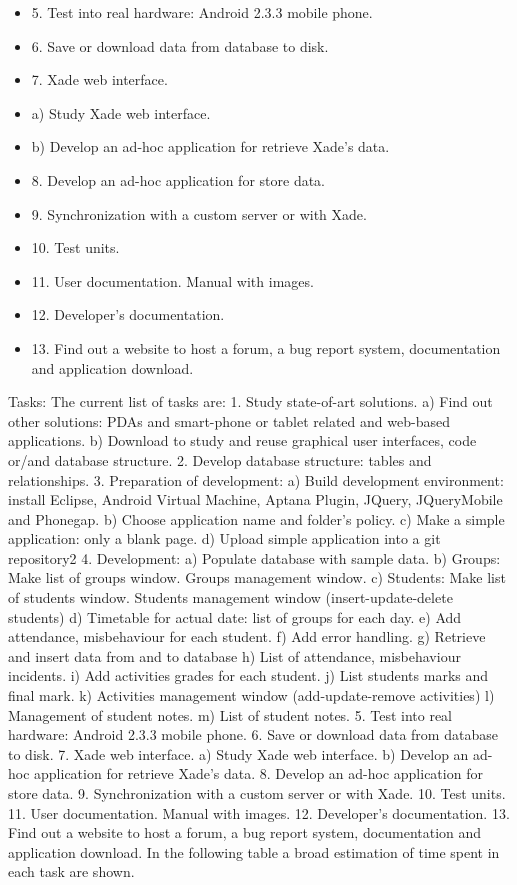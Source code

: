   \begin{itemize}
  \item    5. Test into real hardware: Android 2.3.3 mobile phone.
  \item    6. Save or download data from database to disk.
  \item    7. Xade web interface.
  \item    a) Study Xade web interface.
  \item    b) Develop an ad-hoc application for retrieve Xade's data. 
  \item    8. Develop an ad-hoc application for store data. 
  \item    9. Synchronization with a custom server or with Xade.
  \item    10. Test units.
  \item    11. User documentation. Manual with images.
  \item    12. Developer's documentation.
  \item    13. Find out a website to host a forum, a bug report system,  documentation and application download.

	\end{itemize}
Tasks:
	The current list of tasks are:
 1. Study state-of-art solutions. 
 a) Find out other solutions: PDAs and smart-phone or tablet related and web-based applications.
 b) Download to study and reuse graphical user interfaces, code or/and database structure. 
 2. Develop database structure: tables and relationships. 
 3. Preparation of development:
 a) Build development environment: install Eclipse, Android Virtual Machine, Aptana Plugin, JQuery, JQueryMobile and Phonegap.
 b) Choose application name and folder's policy.
 c) Make a simple application: only a blank page.
 d) Upload simple application into a git repository2
 4. Development:
 a) Populate database with sample data.
 b) Groups:
Make list of groups window.
Groups management window.
 c) Students:
Make list of students window.
Students management window (insert-update-delete students)
 d) Timetable for actual date: list of groups for each day.
 e) Add attendance, misbehaviour for each student.
 f) Add error handling.
 g) Retrieve and insert data from and to database
 h) List of attendance, misbehaviour incidents.
 i) Add activities grades for each student.
 j) List students marks and final mark.
 k) Activities management window (add-update-remove activities)
 l) Management of student notes.
 m) List of student notes. 
 5. Test into real hardware: Android 2.3.3 mobile phone.
 6. Save or download data from database to disk.
 7. Xade web interface.
 a) Study Xade web interface.
 b) Develop an ad-hoc application for retrieve Xade's data. 
 8. Develop an ad-hoc application for store data. 
 9. Synchronization with a custom server or with Xade.
 10. Test units.
 11. User documentation. Manual with images.
 12. Developer's documentation.
 13. Find out a website to host a forum, a bug report system,  documentation and application download.
In the following table a broad estimation of time spent in each task are shown.  

